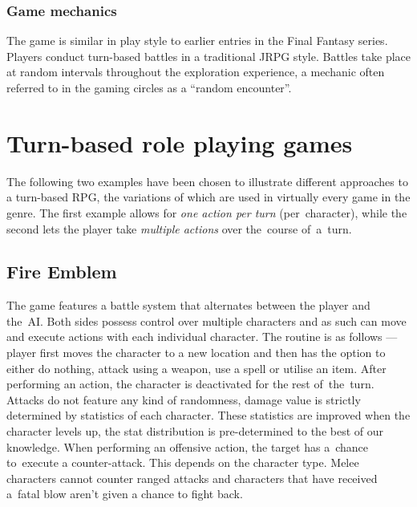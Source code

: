 \documentclass[thesis=B,english,hidelinks]{FITthesisXE}[2012/06/26]
\begin{document}
\subsubsection{Game mechanics}

The game is similar in play style to earlier entries in the Final Fantasy series. Players conduct turn-based battles in a traditional JRPG style. Battles take place at random intervals throughout the exploration experience, a mechanic often referred to in the gaming circles as a ``random encounter''.

\section{Turn-based role playing games}

The following two examples have been chosen to illustrate different approaches to a turn-based RPG, the variations of which are used in virtually every game in the genre. The first example allows for \emph{one action per turn} (per~character), while the second lets the player take \emph{multiple actions} over the~course of~a~turn\autocite{fireemblem}\autocite{dofus}.

\subsection{Fire Emblem}

The game features a battle system that alternates between the player and the~AI. Both sides possess control over multiple characters and as such can move and execute actions with each individual character. The routine is as follows --- player first moves the character to a new location and then has the option to either do nothing, attack using a weapon, use a spell or utilise an item. After performing an action, the character is deactivated for the rest of~the~turn. Attacks do not feature any kind of randomness, damage value is strictly determined by statistics of each character. These statistics are improved when the character levels up, the stat distribution is pre-determined to the best of our knowledge. When performing an offensive action, the target has a~chance to~execute a counter-attack. This depends on the character type. Melee characters cannot counter ranged attacks and characters that have received a~fatal blow aren't given a chance to fight back.
\end{document}
